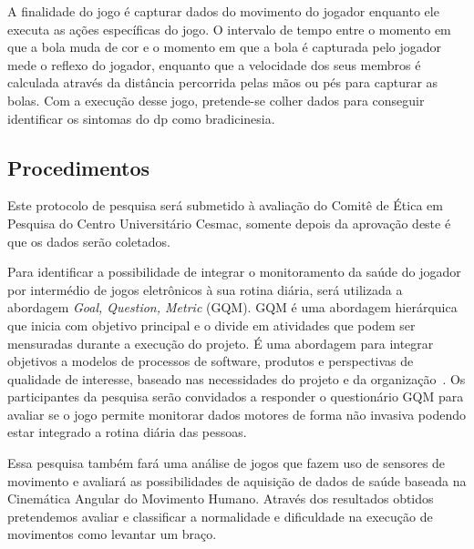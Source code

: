 A finalidade do jogo é capturar dados do movimento do jogador enquanto ele executa as ações específicas do jogo. O intervalo de tempo entre o momento em que a bola muda de cor e o momento em que a bola é capturada pelo jogador mede o reflexo do jogador, enquanto que a velocidade dos seus membros é calculada através da distância percorrida pelas mãos ou pés para capturar as bolas.
Com a execução desse jogo, pretende-se colher dados para conseguir identificar os sintomas do \ac{dp} como bradicinesia.



\subsection{Procedimentos}

Este protocolo de pesquisa será submetido à avaliação do Comitê de Ética em Pesquisa do Centro Universitário Cesmac, somente depois da aprovação deste é que os dados serão coletados.

Para identificar a possibilidade de integrar o monitoramento da saúde do jogador por intermédio de jogos eletrônicos à sua rotina diária, será utilizada a abordagem \textit{Goal, Question, Metric} (GQM). GQM é uma abordagem hierárquica que inicia com objetivo principal e o divide em atividades que podem ser mensuradas durante a execução do projeto. É uma abordagem para integrar objetivos a modelos de processos de software, produtos e perspectivas de qualidade de interesse, baseado nas necessidades do projeto e da organização~\cite{van1999goal}. Os participantes da pesquisa serão convidados a responder o questionário GQM para avaliar se o jogo permite monitorar dados motores de forma não invasiva podendo estar integrado a rotina diária das pessoas.

Essa pesquisa também fará uma análise de jogos que fazem uso de sensores de movimento e avaliará as possibilidades de aquisição de dados de saúde baseada na Cinemática Angular do Movimento Humano. Através dos resultados obtidos pretendemos avaliar e classificar a normalidade e dificuldade na %
execução de movimentos como levantar um braço.

